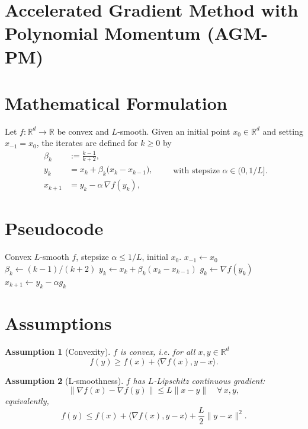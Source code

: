 \documentclass{article}
\newtheorem{assumption}{Assumption}
\begin{document}
\section*{Accelerated Gradient Method with Polynomial Momentum (AGM-PM)}

\section*{Mathematical Formulation}
Let $f:\mathbb{R}^d\rightarrow\mathbb{R}$ be convex and $L$‑smooth.  
Given an initial point $x_{0}\in\mathbb{R}^{d}$ and setting $x_{-1}=x_{0}$, the iterates are defined for $k\ge 0$ by
\[
\boxed{
\begin{aligned}
\beta_{k} &:= \frac{k-1}{k+2},\\[4pt]
y_{k}    &= x_{k}+ \beta_{k}\bigl(x_{k}-x_{k-1}\bigr),\\[4pt]
x_{k+1}  &= y_{k}-\alpha \,\nabla f\!\left(y_{k}\right),
\end{aligned}}
\qquad\text{with stepsize }\alpha\in(0,1/L].
\]

\section*{Pseudocode}
\begin{algorithm}[H]
\caption{AGM-PM}
\begin{algorithmic}[1]
\REQUIRE Convex $L$‑smooth $f$, stepsize $\alpha\le 1/L$, initial $x_{0}$.
\STATE $x_{-1}\gets x_{0}$
    \STATE $\beta_{k}\gets (k-1)/(k+2)$
    \STATE $y_{k}\gets x_{k}+ \beta_{k}(x_{k}-x_{k-1})$
    \STATE $g_{k}\gets \nabla f(y_{k})$
    \STATE $x_{k+1}\gets y_{k}-\alpha g_{k}$
\ENDFOR
\end{algorithmic}
\end{algorithm}

\section*{Assumptions}
\begin{assumption}[Convexity]\label{ass:conv}
$f$ is convex, i.e. for all $x,y\in\mathbb{R}^{d}$
\[
f(y)\ge f(x)+\langle\nabla f(x),y-x\rangle .
\]
\end{assumption}

\begin{assumption}[L‑smoothness]\label{ass:smooth}
$f$ has $L$‑Lipschitz continuous gradient:
\[
\|\nabla f(x)-\nabla f(y)\|\le L\|x-y\|\quad\forall\,x,y,
\]
equivalently,
\[
f(y)\le f(x)+\langle\nabla f(x),y-x\rangle+\frac{L}{2}\|y-x\|^{2}.
\]
\end{assumption}
\end{document}
